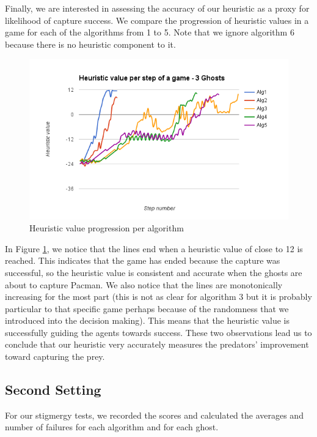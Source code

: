 \documentclass[11pt]{article}
\begin{document}
\begin{multicols}{2}
Finally, we are interested in assessing the accuracy of our heuristic as a proxy for likelihood of capture success. We compare the progression of heuristic values in a game for each of the algorithms from 1 to 5. Note that we ignore algorithm 6 because there is no heuristic component to it.\\
\begin{figure}[H]
	\includegraphics[scale=0.45]{heuristicvalues.png}
	\caption{Heuristic value progression per algorithm}
	\label{fig:heuristicvalueprogression}
\end{figure}

\noindent In Figure \ref{fig:heuristicvalueprogression}, we notice that the lines end when a heuristic value of close to 12 is reached. This indicates that the game has ended because the capture was successful, so the heuristic value is consistent and accurate when the ghosts are about to capture Pacman. We also notice that the lines are monotonically increasing for the most part (this is not as clear for algorithm 3 but it is probably particular to that specific game perhaps because of the randomness that we introduced into the decision making). This means that the heuristic value is successfully guiding the agents towards success. These two observations lead us to conclude that our heuristic very accurately measures the predators' improvement toward capturing the prey. 

\subsection{Second Setting}

For our stigmergy tests, we recorded the scores and calculated the averages and number of failures for each algorithm and for each ghost. 


\end{multicols}
\end{document}
